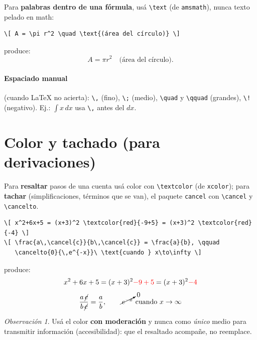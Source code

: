\documentclass[11pt,a4paper]{article}
\newcommand{\C}[1]{\texttt{\textbackslash #1}}   %
\theoremstyle{plain}      %
\theoremstyle{definition} %
\theoremstyle{remark}
\newtheorem*{obs}{Observación}
\begin{document}
Para \textbf{palabras dentro de una fórmula}, usá \C{text} (de
\texttt{amsmath}), nunca texto pelado en math:
\begin{lstlisting}
\[ A = \pi r^2 \quad \text{(área del círculo)} \]
\end{lstlisting}
produce: \[ A = \pi r^2 \quad \text{(área del círculo)}. \]

\paragraph{Espaciado manual} (cuando \LaTeX{} no acierta): \C{,} (fino),
\C{;} (medio), \C{quad} y \C{qquad} (grandes), \C{!} (negativo).
Ej.: $\int x\,dx$ usa \C{,} antes del $dx$.

\section{Color y tachado (para derivaciones)}
Para \textbf{resaltar} pasos de una cuenta usá color con \C{textcolor} (de
\texttt{xcolor}); para \textbf{tachar} (simplificaciones, términos que se van),
el paquete \texttt{cancel} con \C{cancel} y \C{cancelto}.
\begin{lstlisting}
\[ x^2+6x+5 = (x+3)^2 \textcolor{red}{-9+5} = (x+3)^2 \textcolor{red}{-4} \]
\[ \frac{a\,\cancel{c}}{b\,\cancel{c}} = \frac{a}{b}, \qquad
   \cancelto{0}{\,e^{-x}}\ \text{cuando } x\to\infty \]
\end{lstlisting}
produce:
\[ x^2+6x+5 = (x+3)^2 \textcolor{red}{-9+5} = (x+3)^2 \textcolor{red}{-4} \]
\[ \frac{a\,\cancel{c}}{b\,\cancel{c}} = \frac{a}{b}, \qquad
   \cancelto{0}{\,e^{-x}}\ \text{cuando } x\to\infty \]
\begin{obs}
Usá el color \textbf{con moderación} y nunca como \emph{único} medio para
transmitir información (accesibilidad): que el resaltado acompañe, no reemplace.
\end{obs}

\end{document}
